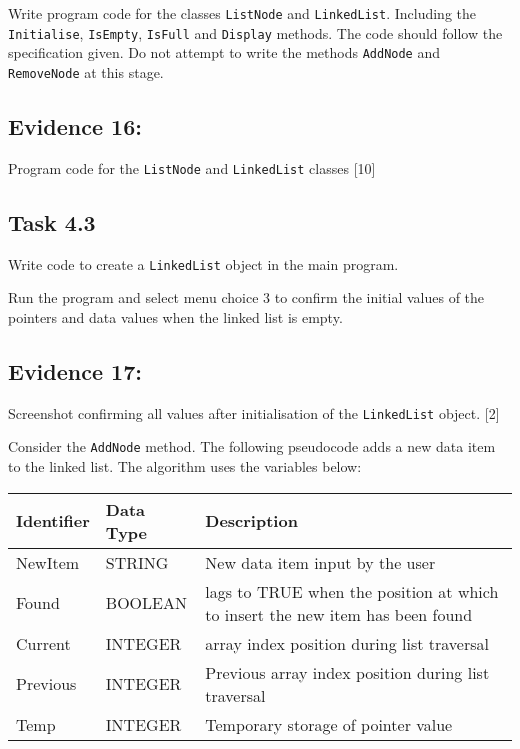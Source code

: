 Write program code for the classes \texttt{ListNode} and \texttt{LinkedList}.
Including the \texttt{Initialise}, \texttt{IsEmpty}, \texttt{IsFull}
and \texttt{Display} methods. The code should follow the specification
given. Do not attempt to write the methods \texttt{AddNode} and \texttt{RemoveNode}
at this stage.

\subsection*{Evidence 16: }

Program code for the \texttt{ListNode} and \texttt{LinkedList} classes
\hfill{}{[}10{]}

\subsection*{Task 4.3 }

Write code to create a \texttt{LinkedList} object in the main program. 

Run the program and select menu choice 3 to confirm the initial values
of the pointers and data values when the linked list is empty. 

\subsection*{Evidence 17:}

Screenshot confirming all values after initialisation of the \texttt{LinkedList}
object.\hfill{} {[}2{]}

Consider the \texttt{AddNode} method. The following pseudocode adds
a new data item to the linked list. The algorithm uses the variables
below:
\begin{center}
\begin{tabular}{|l|l|l|}
\hline 
\texttt{\hspace{0.01\columnwidth}}Identifier & \texttt{\hspace{0.01\columnwidth}}Data Type & \texttt{\hspace{0.05\columnwidth}}Description\tabularnewline
\hline 
NewItem & STRING & New data item input by the user\tabularnewline
\hline 
Found & BOOLEAN & lags to TRUE when the position at which to insert the new item has
been found\tabularnewline
\hline 
Current & INTEGER & array index position during list traversal\tabularnewline
\hline 
Previous & INTEGER & Previous array index position during list traversal\tabularnewline
\hline 
Temp & INTEGER & Temporary storage of pointer value\tabularnewline
\hline 
\end{tabular}
\par\end{center}

